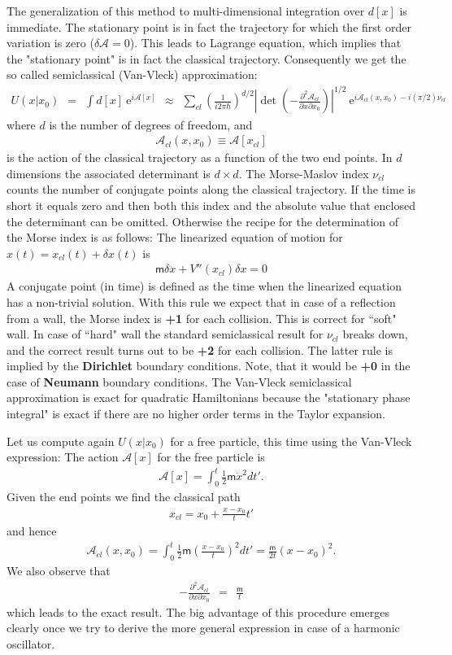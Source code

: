 \documentclass[onecolumn,fleqn]{revtex4}
\newcommand{\eexp}{\mathrm{e}^}
\newcommand{\mass}{\mathsf{m}}
\newcommand{\beq}{\begin{eqnarray}}
\newcommand{\eeq}{\end{eqnarray}}
\begin{document}
The generalization of this method to multi-dimensional integration 
over $d[x]$ is immediate. The stationary point is in fact the trajectory 
for which the first order variation is zero ($\delta \mathcal{A} = 0$). 
This leads to Lagrange equation, which implies that the 
"stationary point" is in fact the classical trajectory.
Consequently we get the so called semiclassical (Van-Vleck) approximation:     
\beq
U(x|x_0) \ \ = \ \ 
\int d[x] \ \eexp{i\mathcal{A}[x]}
\ \ \approx  \ \ 
\sum_{cl}\left(\frac{1}{i 2\pi\hbar }\right)^{{d}/{2}}
\left|\det\left( -\frac {\partial^{2}\mathcal{A}_{cl}} {\partial x\partial x_0} \right)\right|^{1/2} 
\ \eexp{i \mathcal{A}_{cl}(x,x_0) - i(\pi/2)\nu_{cl}}
\eeq
where $d$ is the number of degrees of freedom, and 
\beq
\mathcal{A}_{cl}(x,x_{0})\equiv \mathcal{A}[x_{cl}] 
\eeq
is the action of the classical trajectory as a function 
of the two end points. In $d$ dimensions the associated 
determinant is $d \times d$. 
The Morse-Maslov index $\nu_{cl}$ counts the number of 
conjugate points along the classical trajectory.
If the time is short it equals zero and then both this 
index and the absolute value that enclosed the determinant
can be omitted. Otherwise the recipe for the determination 
of the Morse index is as follows:
The linearized equation of motion 
for $x(t) = x_{cl}(t) + \delta x(t)$ is
\beq
\mass \delta \ddot{x} + V''(x_{cl}) \delta x = 0
\eeq
A conjugate point (in time) is defined as the time when the 
linearized equation has a non-trivial solution.
With this rule we expect that in case of a reflection from 
a wall, the Morse index is {\bf +1} for each collision. 
This is correct for ``soft" wall. In case of ``hard" wall 
the standard semiclassical result for $\nu_{cl}$ breaks down, 
and the correct result turns out to be {\bf +2} for each collision. 
The latter rule is implied by the {\bf Dirichlet} boundary conditions. 
Note, that it would be {\bf +0} in the case of {\bf Neumann} boundary conditions.
The Van-Vleck semiclassical approximation is exact for 
quadratic Hamiltonians because the "stationary phase integral" is exact 
if there are no higher order terms in the Taylor expansion.  


Let us compute again $U(x|x_0)$ for a free particle, 
this time using the Van-Vleck expression: 
The action $\mathcal{A}[x]$ for the free particle is  
\beq
\mathcal{A}[x]=\int_{0}^{t}\frac{1}{2}\mass \dot{x}^{2}dt'.
\eeq
Given the end points we find the classical path  
\beq
x_{cl}=x_{0}+\frac{x-x_{0}}{t}t'
\eeq
and hence 
\beq
\mathcal{A}_{cl}(x,x_0)=\int_{0}^{t}\frac{1}{2}
\mass(\frac{x-x_{0}}{t})^{2}dt' =
\frac{\mass}{2t}(x-x_0)^2.
\eeq
We also observe that 
\beq
-\frac{\partial^{2}\mathcal{A}_{cl}}{\partial x\partial x_0} 
\ \ = \ \ \frac{\mass}{t}
\eeq
which leads to the exact result.
The big advantage of this procedure 
emerges clearly once we try to 
derive the more general expression 
in case of a harmonic oscillator. 
\end{document}
